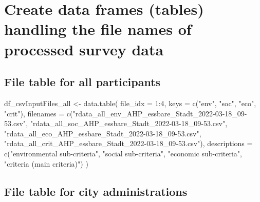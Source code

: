 \documentclass[
]{article}
\newenvironment{Shaded}{\begin{snugshade}}{\end{snugshade}}
\newcommand{\AttributeTok}[1]{\textcolor[rgb]{0.00,0.34,0.68}{#1}}
\newcommand{\DecValTok}[1]{\textcolor[rgb]{0.69,0.50,0.00}{#1}}
\newcommand{\FunctionTok}[1]{\textcolor[rgb]{0.39,0.29,0.61}{#1}}
\newcommand{\NormalTok}[1]{\textcolor[rgb]{0.12,0.11,0.11}{#1}}
\newcommand{\OtherTok}[1]{\textcolor[rgb]{0.00,0.43,0.16}{#1}}
\newcommand{\SpecialCharTok}[1]{\textcolor[rgb]{0.24,0.68,0.91}{#1}}
\newcommand{\StringTok}[1]{\textcolor[rgb]{0.75,0.01,0.01}{#1}}
\begin{document}
\hypertarget{create-data-frames-tables-handling-the-file-names-of-processed-survey-data}{%
\section{Create data frames (tables) handling the file names of
processed survey
data}\label{create-data-frames-tables-handling-the-file-names-of-processed-survey-data}}

\hypertarget{file-table-for-all-participants}{%
\subsection{File table for all
participants}\label{file-table-for-all-participants}}

\begin{Shaded}
\begin{Highlighting}[]
\NormalTok{df\_csvInputFiles\_all }\OtherTok{\textless{}{-}} \FunctionTok{data.table}\NormalTok{(}
  \AttributeTok{file\_idx =} \DecValTok{1}\SpecialCharTok{:}\DecValTok{4}\NormalTok{,}
  \AttributeTok{keys =} \FunctionTok{c}\NormalTok{(}\StringTok{"env"}\NormalTok{, }\StringTok{"soc"}\NormalTok{, }\StringTok{"eco"}\NormalTok{, }\StringTok{"crit"}\NormalTok{),}
  \AttributeTok{filenames =} \FunctionTok{c}\NormalTok{(}\StringTok{"rdata\_all\_env\_AHP\_essbare\_Stadt\_2022{-}03{-}18\_09{-}53.csv"}\NormalTok{,}
                \StringTok{"rdata\_all\_soc\_AHP\_essbare\_Stadt\_2022{-}03{-}18\_09{-}53.csv"}\NormalTok{,}
                \StringTok{"rdata\_all\_eco\_AHP\_essbare\_Stadt\_2022{-}03{-}18\_09{-}53.csv"}\NormalTok{,}
                \StringTok{"rdata\_all\_crit\_AHP\_essbare\_Stadt\_2022{-}03{-}18\_09{-}53.csv"}\NormalTok{),}
  \AttributeTok{descriptions =} \FunctionTok{c}\NormalTok{(}\StringTok{"environmental sub{-}criteria"}\NormalTok{,}
                   \StringTok{"social sub{-}criteria"}\NormalTok{,}
                   \StringTok{"economic sub{-}criteria"}\NormalTok{,}
                   \StringTok{"criteria (main criteria)"}\NormalTok{)}
\NormalTok{)}
\end{Highlighting}
\end{Shaded}

\hypertarget{file-table-for-city-administrations}{%
\subsection{File table for city
administrations}\label{file-table-for-city-administrations}}
\end{document}
